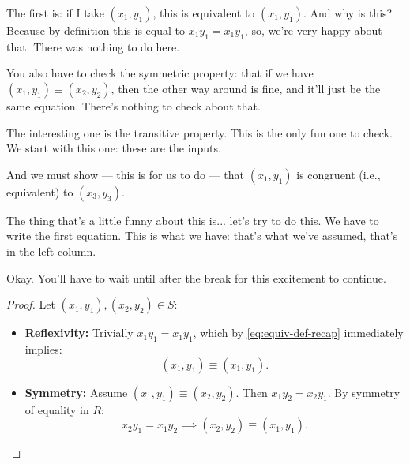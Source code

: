 \begin{speech}[00:43:24 - 00:45:05]
The first is: if I take $(x_1, y_1)$, this is equivalent to $(x_1, y_1)$.  And why is this? Because by definition this is equal to $x_1 y_1 = x_1 y_1$,  so, we're very happy about that. There was nothing to do here.

You also have to check the symmetric property: that if we have $(x_1, y_1) \equiv (x_2, y_2)$, then the other way around is fine, and it'll just be the same equation. There's nothing to check about that.

The interesting one is the transitive property.  This is the only fun one to check. We start with this one:  these are the inputs.

And we must show --- this is for us to do --- that $(x_1, y_1)$ is congruent (i.e., equivalent) to $(x_3, y_3)$. 

The thing that's a little funny about this is... let's try to do this. We have to write the first equation. This is what we have:  that's what we've assumed, that's in the left column.

Okay. You'll have to wait until after the break for this excitement to continue.
\end{speech}

\begin{content}

\begin{proof}
Let $(x_1, y_1), (x_2, y_2) \in S$:
\begin{itemize}
    \item \textbf{Reflexivity:} Trivially $x_1 y_1 = x_1 y_1$, which by \eqref{eq:equiv-def-recap} immediately implies:
    \[
    (x_1, y_1) \equiv (x_1, y_1).
    \]
    \item \textbf{Symmetry:} Assume $(x_1, y_1) \equiv (x_2, y_2)$. Then $x_1 y_2 = x_2 y_1$. By symmetry of equality in $R$:
    \[
    x_2 y_1 = x_1 y_2 \implies (x_2, y_2) \equiv (x_1, y_1).
    \]
\end{itemize}
\end{proof}
\end{content}

